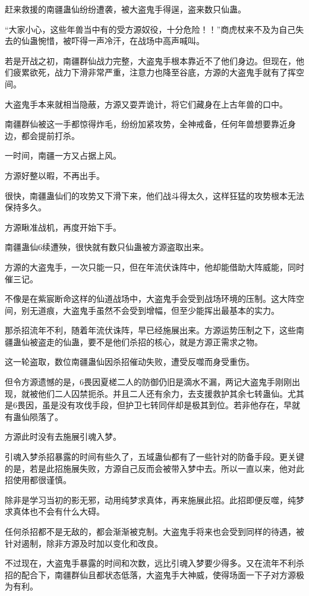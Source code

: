 \begin{this_body}
赶来救援的南疆蛊仙纷纷遭袭，被大盗鬼手得逞，盗来数只仙蛊。

“大家小心，这些年兽当中有的受方源奴役，十分危险！！”商虎杖来不及为自己失去的仙蛊惋惜，被吓得一声冷汗，在战场中高声喊叫。

若是开战之初，南疆群仙战力完整，大盗鬼手根本靠近不了他们身边。但现在，他们疲累欲死，战力下滑非常严重，注意力也降至谷底，方源的大盗鬼手就有了挥空间。

大盗鬼手本来就相当隐蔽，方源又耍弄诡计，将它们藏身在上古年兽的口中。

南疆群仙被这一手都惊得炸毛，纷纷加紧攻势，全神戒备，任何年兽想要靠近身边，都会提前打杀。

一时间，南疆一方又占据上风。

方源好整以暇，不再出手。

很快，南疆蛊仙们的攻势又下滑下来，他们战斗得太久，这样狂猛的攻势根本无法保持多久。

方源瞅准战机，再度开始下手。

南疆蛊仙6续遭殃，很快就有数只仙蛊被方源盗取出来。

方源的大盗鬼手，一次只能一只，但在年流伏诛阵中，他却能借助大阵威能，同时催三记。

不像是在紫宸断命这样的仙道战场中，大盗鬼手会受到战场环境的压制。这大阵空间，别无道痕，大盗鬼手虽然不会受到增幅，但至少能挥出最基本的实力。

那杀招流年不利，随着年流伏诛阵，早已经施展出来。方源运势压制之下，这些南疆蛊仙被盗走的仙蛊，要不是他们杀招的核心，就是方源正需求之物。

这一轮盗取，数位南疆蛊仙因杀招催动失败，遭受反噬而身受重伤。

但令方源遗憾的是，6畏因夏槎二人的防御仍旧是滴水不漏，两记大盗鬼手刚刚出现，就被他们二人囚禁扼杀。并且二人还有余力，去支援救护其余七转蛊仙。尤其是6畏因，虽是没有攻伐手段，但护卫七转同伴却是极其到位。若非他存在，早就有蛊仙陨落了。

方源此时没有去施展引魂入梦。

引魂入梦杀招暴露的时间有些久了，五域蛊仙都有了一些针对的防备手段。更关键的是，若是此招施展失败，方源自己反而会被带入梦中去。所以一直以来，他对此招使用都很谨慎。

除非是学习当初的影无邪，动用纯梦求真体，再来施展此招。此招即便反噬，纯梦求真体也不会有什么大碍。

任何杀招都不是无敌的，都会渐渐被克制。大盗鬼手将来也会受到同样的待遇，被针对遏制，除非方源及时加以变化和改良。

不过现在，大盗鬼手暴露的时间和次数，远比引魂入梦要少得多。又在流年不利杀招的配合下，南疆群仙且都状态低落，大盗鬼手大神威，使得场面一下子对方源极为有利。


\end{this_body}
